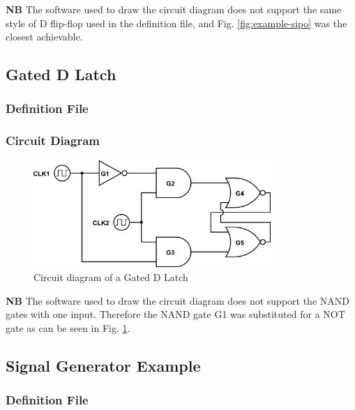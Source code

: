 \documentclass[a4paper,10pt]{article}
\begin{document}
\textbf{NB} The software used to draw the circuit diagram does not support the same style of D flip-flop used in the definition file, and Fig. \ref{fig:example-sipo} was the closest achievable.

\subsection{Gated D Latch}

\subsubsection{Definition File}


\subsubsection{Circuit Diagram}
\begin{figure}[h]
 \centering
 \includegraphics[width=9cm]{../../examples/gated-d-latch.png}
 \caption{Circuit diagram of a Gated D Latch}
 \label{fig:example-dlatch}
\end{figure}

\textbf{NB} The software used to draw the circuit diagram does not support the NAND gates with one input. Therefore the NAND gate G1 was substituted for a NOT gate as can be seen in Fig. \ref{fig:example-dlatch}.

\subsection{Signal Generator Example}

\subsubsection{Definition File}

\end{document}
